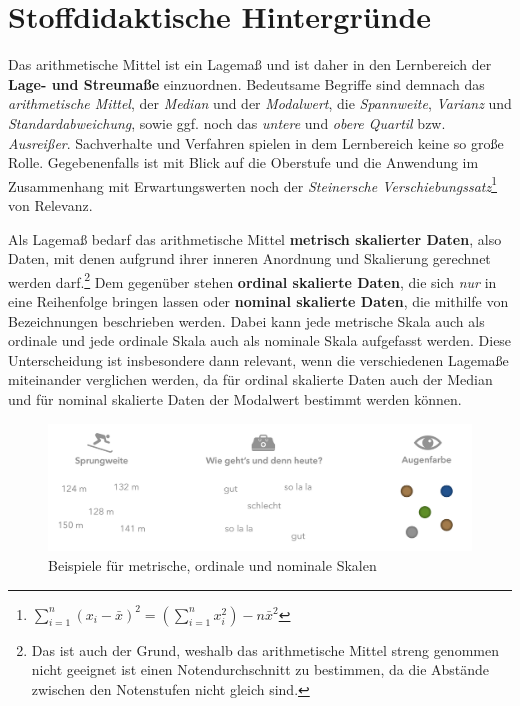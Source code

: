 \documentclass[
]{scrbook}
\theoremstyle{definition}
\theoremstyle{definition}
\theoremstyle{definition}
\theoremstyle{definition}
\theoremstyle{remark}
\begin{document}
\section{Stoffdidaktische Hintergründe}\label{stoffdidaktische-hintergruxfcnde}

Das \textcolor{formalColor}{arithmetische Mittel} ist ein Lagemaß und ist daher in den Lernbereich der \textbf{Lage- und Streumaße} einzuordnen. Bedeutsame Begriffe sind demnach das \emph{arithmetische Mittel}, der \emph{Median} und der \emph{Modalwert}, die \emph{Spannweite}, \emph{Varianz} und \emph{Standardabweichung}, sowie ggf. noch das \emph{untere} und \emph{obere Quartil} bzw. \emph{Ausreißer}. Sachverhalte und Verfahren spielen in dem Lernbereich keine so große Rolle. Gegebenenfalls ist mit Blick auf die Oberstufe und die Anwendung im Zusammenhang mit Erwartungswerten noch der \emph{Steinersche Verschiebungssatz}\footnote{\(\sum\limits_{i=1}^n (x_i-\bar{x})^2 = \left(\sum\limits_{i=1}^nx_i^2\right)-n\bar{x}^2\)} von Relevanz.

Als Lagemaß bedarf das arithmetische Mittel \textbf{metrisch skalierter Daten}, also Daten, mit denen aufgrund ihrer inneren Anordnung und Skalierung gerechnet werden darf.\footnote{Das ist auch der Grund, weshalb das arithmetische Mittel streng genommen nicht geeignet ist einen Notendurchschnitt zu bestimmen, da die Abstände zwischen den Notenstufen nicht gleich sind.} Dem gegenüber stehen \textbf{ordinal skalierte Daten}, die sich \emph{nur} in eine Reihenfolge bringen lassen oder \textbf{nominal skalierte Daten}, die mithilfe von Bezeichnungen beschrieben werden. Dabei kann jede metrische Skala auch als ordinale und jede ordinale Skala auch als nominale Skala aufgefasst werden. Diese Unterscheidung ist insbesondere dann relevant, wenn die verschiedenen Lagemaße miteinander verglichen werden, da für ordinal skalierte Daten auch der Median und für nominal skalierte Daten der Modalwert bestimmt werden können.

\begin{figure}

{\centering \includegraphics[width=0.9\linewidth]{pictures/B-Skalen} 

}

\caption{Beispiele für metrische, ordinale und nominale Skalen}\label{fig:Skalen}
\end{figure}
\end{document}
